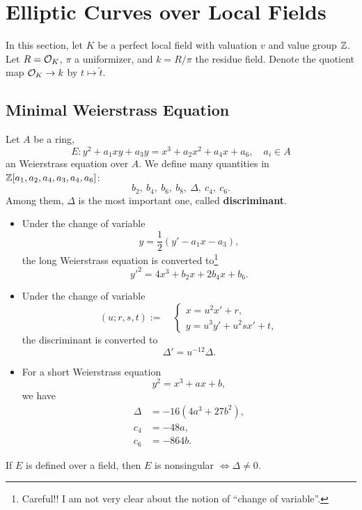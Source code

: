 \section{Elliptic Curves over Local Fields}
In this section, let $K$ be a perfect local field with valuation $v$
and value group $\mathbb{Z}$. Let $R = \mathcal{O}_K$, $\pi$ a uniformizer,
and $k = R/\pi$ the residue field.
Denote the quotient map $\mathcal{O}_K\to k$ by $t\mapsto \tilde{t}$.
\subsection{Minimal Weierstrass Equation}

\begin{definition}
    Let $A$ be a ring, \[E : 
    y^2 + a_1xy + a_3y = x^3 + a_2x^2 + a_4x + a_6,\quad a_i\in A\]
    an Weierstrass equation over $A$.
    We define many quantities in $\mathbb{Z}[a_1, a_2, a_4, a_3, a_4, a_6]$:
    \[b_2,\ b_4,\ b_6,\ b_8,\ \Delta,\ c_4,\ c_6.\]
    Among them, $\Delta$ is the most important one, called \textbf{discriminant}.
\end{definition}
\begin{remark}
\begin{itemize}
\item Under the change of variable \[y = \frac{1}{2}(y' - a_1x - a_3),\]
the long Weierstrass equation is converted to\footnote{
    Careful!! I am not very clear about the notion of ``change of variable''.}
\[
y'^2 = 4x^3 + b_2x + 2b_4x + b_6.\]
\item Under the change of variable \[(u; r, s, t) := \quad
\begin{cases}
    x = u^2x' + r,\\ y = u^3y' + u^2sx' + t,
\end{cases}\]
the discriminant is converted to \[\Delta' = u^{-12}\Delta.\]
\item For a short Weierstrass equation\[
y^2 = x^3 + ax + b,\]
we have \begin{align*}
    \Delta &= -16(4a^3 + 27b^2),\\
    c_4 &= -48a,\\
    c_6 &= -864b.
\end{align*}
\end{itemize}

\begin{proposition}
    If $E$ is defined over a field, then $E$ is nonsingular $\iff \Delta \ne 0$.
\end{proposition}


\end{remark}
